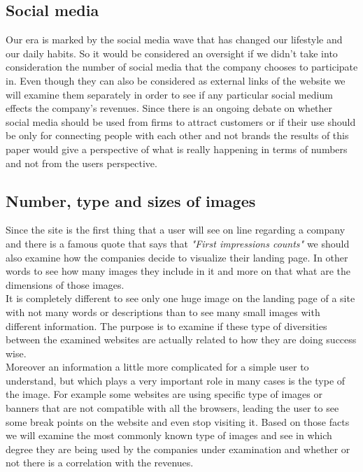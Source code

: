 \documentclass{book}
\begin{document}
\subsection{Social media}\label{M:Social media}
Our era is marked by the social media wave that has changed our lifestyle and our daily habits. So it would be considered an oversight if we didn't take into consideration the number of social media that the company chooses to participate in. Even though they can also be considered as external links of the website we will examine them separately in order to see if any particular social medium effects the company's revenues. Since there is an ongoing debate on whether social media should be used from firms to attract customers or if their use should be only for connecting people with each other and not brands the results of this paper would give a perspective of what is really happening in terms of numbers and not from the users perspective.
\subsection{Number, type and sizes of images}\label{M:N,T,S Imgs}
Since the site is the first thing that a user will see on line regarding a company and there is a famous quote that says that \textit{"First impressions counts"} we should also examine how the companies decide to visualize their landing page. In other words to see how many images they include in it and more on that what are the dimensions of those images.\\ 
It is completely different to see only one huge image on the landing page of a site with not many words or descriptions than to see many small images with different information. The purpose is to examine if these type of diversities between the examined websites are actually related to how they are doing success wise.\\
Moreover an information a little more complicated for a simple user to understand, but which  plays a very important role in many cases is the type of the image. For example some websites are using specific type of images or banners that are not compatible with all the browsers, leading the user to see some break points on the website and even stop visiting it. Based on those facts we will examine the most commonly known type of images and see in which degree they are being used by the companies under examination and whether or not there is a correlation with the revenues.
\end{document}
